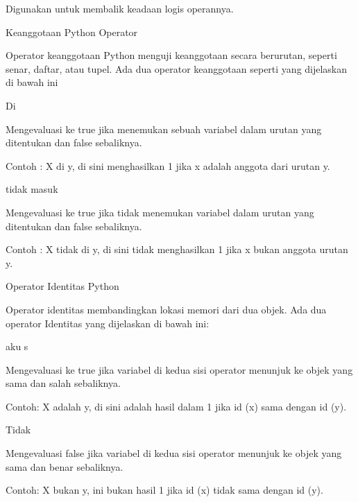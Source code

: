\vspace{12pt}
\noindent 
Digunakan untuk membalik keadaan logis operannya. \par
\vspace{12pt}
\noindent 
Keanggotaan Python Operator \par
\vspace{12pt}
\noindent 
Operator keanggotaan Python menguji keanggotaan secara berurutan, seperti senar, daftar, atau tupel. $  $Ada dua operator keanggotaan seperti yang dijelaskan di bawah ini \par
\vspace{12pt}
\noindent 
Di \par
\noindent 
Mengevaluasi ke true jika menemukan sebuah variabel dalam urutan yang ditentukan dan false sebaliknya. \par
\noindent 
Contoh : X di y, di sini menghasilkan 1 jika x adalah anggota dari urutan y. \par
\vspace{12pt}
\noindent 
tidak masuk \par
\noindent 
Mengevaluasi ke true jika tidak menemukan variabel dalam urutan yang ditentukan dan false sebaliknya. \par
\noindent 
Contoh : X tidak di y, di sini tidak menghasilkan 1 jika x bukan anggota urutan y. \par
\vspace{12pt}
\noindent 
Operator Identitas Python \par
\vspace{12pt}
\noindent 
Operator identitas membandingkan lokasi memori dari dua objek. $  $Ada dua operator Identitas yang dijelaskan di bawah ini: \par
\vspace{12pt}
\noindent 
aku s \par
\noindent 
Mengevaluasi ke true jika variabel di kedua sisi operator menunjuk ke objek yang sama dan salah sebaliknya. \par
\noindent 
Contoh: X adalah y, di sini $  $adalah $  $hasil dalam 1 jika id (x) sama dengan id (y). \par
\vspace{12pt}
\noindent 
Tidak \par
\noindent 
Mengevaluasi false jika variabel di kedua sisi operator menunjuk ke objek yang sama dan benar sebaliknya. \par
\noindent 
Contoh: X bukan y, $  $ini bukan $  $hasil 1 jika id (x) tidak sama dengan id (y). \par
